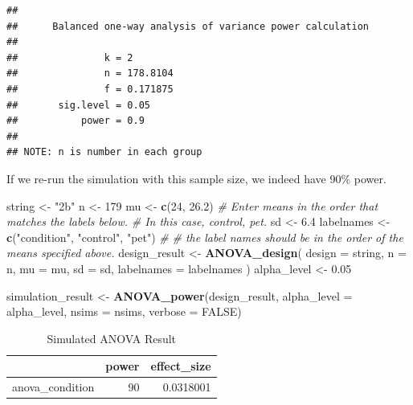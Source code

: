 \documentclass[]{book}
\newenvironment{Shaded}{\begin{snugshade}}{\end{snugshade}}
\newcommand{\CommentTok}[1]{\textcolor[rgb]{0.56,0.35,0.01}{\textit{#1}}}
\newcommand{\DataTypeTok}[1]{\textcolor[rgb]{0.13,0.29,0.53}{#1}}
\newcommand{\DecValTok}[1]{\textcolor[rgb]{0.00,0.00,0.81}{#1}}
\newcommand{\FloatTok}[1]{\textcolor[rgb]{0.00,0.00,0.81}{#1}}
\newcommand{\KeywordTok}[1]{\textcolor[rgb]{0.13,0.29,0.53}{\textbf{#1}}}
\newcommand{\NormalTok}[1]{#1}
\newcommand{\OtherTok}[1]{\textcolor[rgb]{0.56,0.35,0.01}{#1}}
\newcommand{\StringTok}[1]{\textcolor[rgb]{0.31,0.60,0.02}{#1}}
\begin{document}
\begin{verbatim}
## 
##      Balanced one-way analysis of variance power calculation 
## 
##               k = 2
##               n = 178.8104
##               f = 0.171875
##       sig.level = 0.05
##           power = 0.9
## 
## NOTE: n is number in each group
\end{verbatim}

If we re-run the simulation with this sample size, we indeed have 90\% power.

\begin{Shaded}
\begin{Highlighting}[]
\NormalTok{string <-}\StringTok{ "2b"}
\NormalTok{n <-}\StringTok{ }\DecValTok{179}
\NormalTok{mu <-}\StringTok{ }\KeywordTok{c}\NormalTok{(}\DecValTok{24}\NormalTok{, }\FloatTok{26.2}\NormalTok{)}
\CommentTok{# Enter means in the order that matches the labels below.}
\CommentTok{# In this case, control, pet.}
\NormalTok{sd <-}\StringTok{ }\FloatTok{6.4}
\NormalTok{labelnames <-}\StringTok{ }\KeywordTok{c}\NormalTok{(}\StringTok{"condition"}\NormalTok{, }\StringTok{"control"}\NormalTok{, }\StringTok{"pet"}\NormalTok{) }\CommentTok{#}
\CommentTok{# the label names should be in the order of the means specified above.}
\NormalTok{design_result <-}\StringTok{ }\KeywordTok{ANOVA_design}\NormalTok{(}
\DataTypeTok{design =}\NormalTok{ string,}
\DataTypeTok{n =}\NormalTok{ n,}
\DataTypeTok{mu =}\NormalTok{ mu,}
\DataTypeTok{sd =}\NormalTok{ sd,}
\DataTypeTok{labelnames =}\NormalTok{ labelnames}
\NormalTok{)}
\NormalTok{alpha_level <-}\StringTok{ }\FloatTok{0.05}

\NormalTok{simulation_result <-}\StringTok{ }\KeywordTok{ANOVA_power}\NormalTok{(design_result, }
                                 \DataTypeTok{alpha_level =}\NormalTok{ alpha_level, }
                                 \DataTypeTok{nsims =}\NormalTok{ nsims,}
                                 \DataTypeTok{verbose =} \OtherTok{FALSE}\NormalTok{)}
\end{Highlighting}
\end{Shaded}

\begin{table}[t]

\caption{\label{tab:unnamed-chunk-21}Simulated ANOVA Result}
\centering
\begin{tabular}{l|r|r}
\hline
  & power & effect\_size\\
\hline
anova\_condition & 90 & 0.0318001\\
\hline
\end{tabular}
\end{table}
\end{document}
